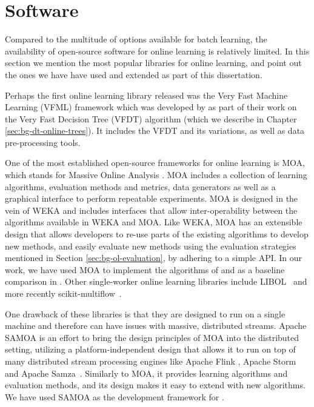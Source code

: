 \section{Software}
\label{sec:bg-ol-software}

Compared to the multitude of options available for batch learning, the availability
of open-source software for online learning is relatively limited. In this section we
mention the most popular libraries for online learning, and point out the ones we have have used
and extended as part of this dissertation.

Perhaps the first online learning library released was the Very Fast Machine Learning (VFML) framework which was developed by \citet{vfdt} as part of their work on the Very Fast Decision Tree (VFDT) algorithm (which we describe in Chapter \ref{sec:bg-dt-online-trees}).
It includes the VFDT and its variations, as well as data pre-processing tools.

One of the most established open-source frameworks for online learning is MOA, which stands
for Massive Online Analysis \cite{bifet2010moa}. MOA includes a collection of
learning algorithms, evaluation methods and metrics, data generators as well as
a graphical interface to perform repeatable experiments. MOA is designed in the
vein of WEKA \cite{weka} and includes interfaces that allow inter-operability
between the algorithms available in WEKA and MOA. Like WEKA, MOA has an extensible
design that allows developers to re-use parts of the existing algorithms to develop
new methods, and easily evaluate new methods using the evaluation strategies mentioned
in Section \ref{sec:bg-ol-evaluation}, by adhering to a simple API. In our work,
we have used MOA to implement the algorithms of \uncertaintrees and as a baseline comparison
in \boostvht. Other single-worker online learning libraries
include LIBOL~\cite{libol} and more recently scikit-multiflow~\cite{sk-multiflow}.

One drawback of these libraries is that they are designed to run on a single machine and therefore
can have issues with massive, distributed streams. Apache SAMOA \cite{samoa} is an effort
to bring the design principles of MOA into the distributed setting, utilizing a platform-independent
design that allows it to run on top of many distributed stream processing engines like
Apache Flink \cite{flink}, Apache Storm~\cite{storm} and Apache Samza~\cite{samza}.
Similarly to MOA, it provides learning algorithms and evaluation methods, and its
design makes it easy to extend with new algorithms.
We have used SAMOA as the development framework for \boostvht.

